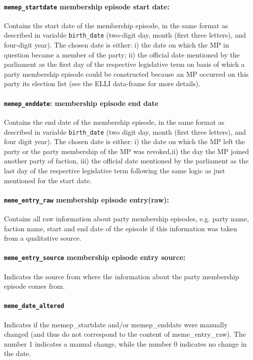 \documentclass{article}
\begin{document}
\paragraph{\texttt{memep\_startdate} membership episode start date:} Contains the start date of the membership episode, in the same format as described in variable \texttt{birth\_date} (two-digit day, month (first three letters), and four-digit year). The chosen date is either: i) the date on which the MP in question became a member of the party; ii) the official date mentioned by the parliament as the first day of the respective legislative term on basis of which a party membership episode could be constructed because an MP occurred on this party its election list (see the ELLI data-frame for more details).

\paragraph{\texttt{memep\_enddate}: membership episode end date} Contains the end date of the membership episode, in the same format as described in variable \texttt{birth\_date} (two digit day, month (first three letters), and four digit year). The chosen date is either: i) the date on which the MP left the party or the party membership of the MP was revoked,ii) the day the MP joined another party of faction, iii) the official date mentioned by the parliament as the last day of the respective legislative term following the same logic as just mentioned for the start date.

\paragraph{\texttt{meme\_entry\_raw} membership episode entry(raw):} Contains all raw information about party membership episodes, e.g. party name, faction name, start and end date of the episode if this information was taken from a qualitative source. 

\paragraph{\texttt{meme\_entry\_source} membership   episode   entry source:} Indicates the source from where the information about the party membership episode comes from.

\paragraph{\texttt{meme\_date\_altered}}  Indicates if the memep\_startdate and/or memep\_enddate were manually changed (and thus do not correspond to the content of meme\_entry\_raw). The number 1 indicates a manual change, while the number 0 indicates no change in the date. 
    
\end{document}
